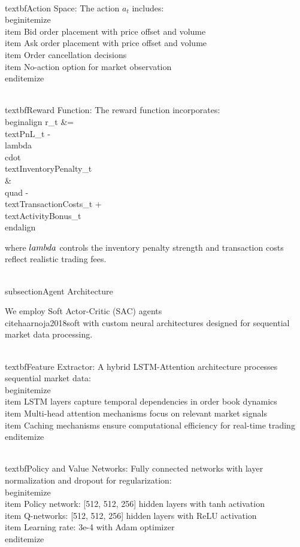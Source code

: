 \documentclass[11pt,a4paper]{article}
\begin{document}
\\textbf{Action Space}: The action $a_t$ includes:
\\begin{itemize}
\\item Bid order placement with price offset and volume
\\item Ask order placement with price offset and volume
\\item Order cancellation decisions
\\item No-action option for market observation
\\end{itemize}

\\textbf{Reward Function}: The reward function incorporates:
\\begin{align}
r_t &= \\text{PnL}_{t} - \\lambda \\cdot \\text{InventoryPenalty}_t \\
&\\quad - \\text{TransactionCosts}_t + \\text{ActivityBonus}_t
\\end{align}

where $\\lambda$ controls the inventory penalty strength and transaction costs reflect realistic trading fees.

\\subsection{Agent Architecture}

We employ Soft Actor-Critic (SAC) agents~\\cite{haarnoja2018soft} with custom neural architectures designed for sequential market data processing.

\\textbf{Feature Extractor}: A hybrid LSTM-Attention architecture processes sequential market data:
\\begin{itemize}
\\item LSTM layers capture temporal dependencies in order book dynamics
\\item Multi-head attention mechanisms focus on relevant market signals
\\item Caching mechanisms ensure computational efficiency for real-time trading
\\end{itemize}

\\textbf{Policy and Value Networks}: Fully connected networks with layer normalization and dropout for regularization:
\\begin{itemize}
\\item Policy network: [512, 512, 256] hidden layers with tanh activation
\\item Q-networks: [512, 512, 256] hidden layers with ReLU activation
\\item Learning rate: 3e-4 with Adam optimizer
\\end{itemize}
\end{document}
